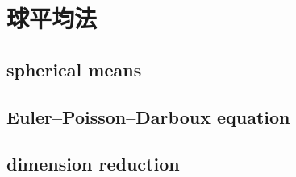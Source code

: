 \section{球平均法}
\label{b2:sec:1101}


\subsection{spherical means}
\label{b2:subsec:110101}

\subsection{Euler–Poisson–Darboux equation}
\label{b2:subsec:110102}

\subsection{dimension reduction}
\label{b2:subsec:110103}


